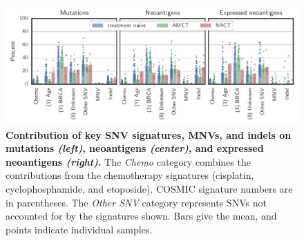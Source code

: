 \begin{figure}[htbp]
\centering
\includegraphics[scale=1.0]{figures/sources_of_mutations_and_neoantigens.pdf}
\caption{\textbf{Contribution of key SNV signatures, MNVs, and indels on mutations \textit{(left)}, neoantigens \textit{(center)}, and expressed neoantigens \textit{(right)}.} The \textit{Chemo} category combines the contributions from the chemotherapy signatures (cisplatin, cyclophosphamide, and etoposide). COSMIC signature numbers are in parentheses. The \textit{Other SNV} category represents SNVs not accounted for by the signatures shown. Bars give the mean, and points indicate individual samples.}
\label{fig:sources}
\end{figure}

\FloatBarrier
